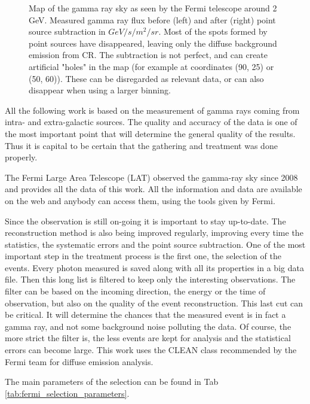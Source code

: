 \begin{figure}[h]
\begin{minipage}[h]{0.45\textwidth}
	  \subcaption{}
	  \label{fig:data_ptsrc_subtracted}
  \end{minipage}
  \caption{Map of the gamma ray sky as seen by the Fermi telescope around 2 GeV. Measured gamma ray flux before (left) and after (right) point source subtraction in $GeV/s/m^2/sr$. Most of the spots formed by point sources have disappeared, leaving only the diffuse background emission from CR. The subtraction is not perfect, and can create artificial "holes" in the map (for example at coordinates (90, 25) or (50, 60)). These can be disregarded as relevant data, or can also disappear when using a larger binning.}
  \label{fig:method_pass8} 
\end{figure}

All the following work is based on the measurement of gamma rays coming from intra- and extra-galactic sources. The quality and accuracy of the data is one of the most important point that will determine the general quality of the results. Thus it is capital to be certain that the gathering and treatment was done properly.

The Fermi Large Area Telescope (LAT) observed the gamma-ray sky since 2008 and provides all the data of this work.
All the information and data are available on the web and anybody can access them, using the tools given by Fermi.

Since the observation is still on-going it is important to stay up-to-date. The reconstruction method is also being improved regularly, improving every time the statistics, the systematic errors and the point source subtraction.
One of the most important step in the treatment process is the first one, the selection of the events. Every photon measured is saved along with all its properties in a big data file. Then this long list is filtered to keep only the interesting observations. The filter can be based on the incoming direction, the energy or the time of observation, but also on the quality of the event reconstruction. This last cut can be critical. It will determine the chances that the measured event is in fact a gamma ray, and not some background noise polluting the data. Of course, the more strict the filter is, the less events are kept for analysis and the statistical errors can become large. This work uses the CLEAN class recommended by the Fermi team for diffuse emission analysis. 

The main parameters of the selection can be found in Tab \ref{tab:fermi_selection_parameters}.

